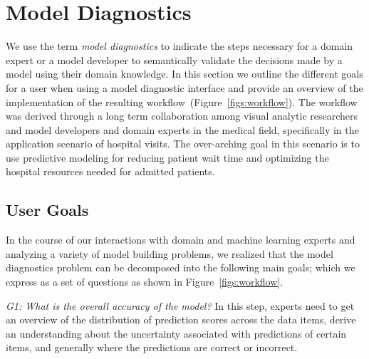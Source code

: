 \section{Model Diagnostics}
\label{sec:model-diagnostics}

We use the term \textit{model diagnostics} to indicate the steps necessary for a domain expert or a model developer to semantically validate the decisions made by a model using their domain knowledge. In this section we outline the different goals for a user when using a model diagnostic interface and provide an overview of the implementation of the resulting workflow~(Figure~\ref{figs:workflow}). 
The workflow was derived through a long term collaboration among visual analytic researchers and model developers and domain experts in the medical field, specifically in the application scenario of hospital visits. The over-arching goal in this scenario is to use predictive modeling for reducing patient wait time and optimizing the hospital resources needed for admitted patients.


\subsection{User Goals}

In the course of our interactions with domain and machine learning experts and analyzing a variety of model building problems, we realized that the model diagnostics problem can be decomposed into the following main goals; which we express as a set of questions as shown in Figure~\ref{figs:workflow}.  


\textit{G1: What is the overall accuracy of the model?} In this step, experts need to get an overview of the distribution of prediction scores across the data items, derive an understanding about the uncertainty associated with predictions of certain items, and generally where the predictions are correct or incorrect.


